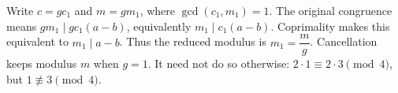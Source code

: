 Write $c=gc_1$ and $m=gm_1$, where $\gcd(c_1,m_1)=1$. The original congruence means $gm_1\mid gc_1(a-b)$, equivalently $m_1\mid c_1(a-b)$. Coprimality makes this equivalent to $m_1\mid a-b$. Thus the reduced modulus is $m_1=\dfrac{m}{g}$. Cancellation keeps modulus $m$ when $g=1$. It need not do so otherwise: $2\cdot1\equiv2\cdot3\pmod4$, but $1\not\equiv3\pmod4$.
